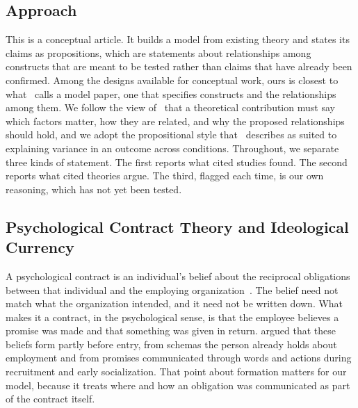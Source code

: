\subsection{Approach}

This is a conceptual article. It builds a model from existing theory and states its claims as propositions, which are statements about relationships among constructs that are meant to be tested rather than claims that have already been confirmed. Among the designs available for conceptual work, ours is closest to what~\citet{jaakkola2020designing} calls a model paper, one that specifies constructs and the relationships among them. We follow the view of~\citet{whetten1989constitutes} that a theoretical contribution must say which factors matter, how they are related, and why the proposed relationships should hold, and we adopt the propositional style that~\citet{cornelissen2017developing} describes as suited to explaining variance in an outcome across conditions. Throughout, we separate three kinds of statement. The first reports what cited studies found. The second reports what cited theories argue. The third, flagged each time, is our own reasoning, which has not yet been tested.

\subsection{Psychological Contract Theory and Ideological Currency}

A psychological contract is an individual's belief about the reciprocal obligations between that individual and the employing organization~\citep{rousseau1989psychological}. The belief need not match what the organization intended, and it need not be written down. What makes it a contract, in the psychological sense, is that the employee believes a promise was made and that something was given in return. \citet{rousseau2001schema} argued that these beliefs form partly before entry, from schemas the person already holds about employment and from promises communicated through words and actions during recruitment and early socialization. That point about formation matters for our model, because it treats where and how an obligation was communicated as part of the contract itself.

